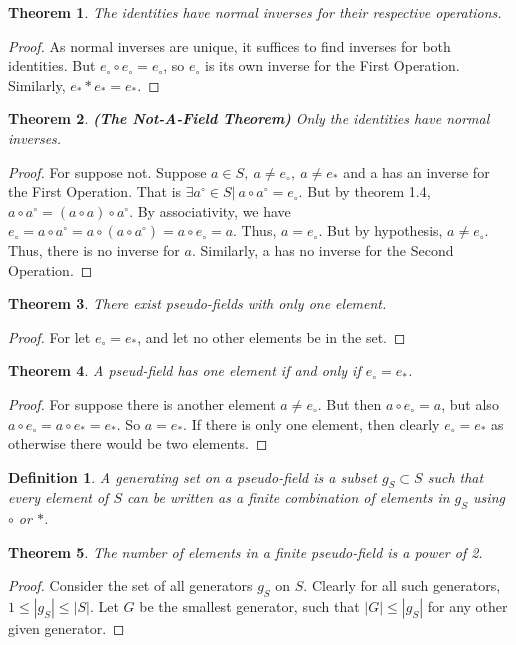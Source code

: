 \documentclass[12pt,oneside]{book}
\theoremstyle{mystyle}
\newtheorem{theorem}{Theorem}[section]
\newtheorem{definition}{Definition}[section]
\begin{document}
\begin{theorem} The identities have normal inverses for their respective operations.
\end{theorem}
\begin{proof} As normal inverses are unique, it suffices to find inverses for both identities. But $e_{\circ}\circ e_{\circ}=e_{\circ}$, so $e_{\circ}$ is its own inverse for the First Operation. Similarly, $e_{*}*e_{*}=e_{*}$.
\end{proof}
\begin{theorem} \textbf{(The Not-A-Field Theorem)} Only the identities have normal inverses.
\end{theorem}
\begin{proof} For suppose not. Suppose $a\in S,\ a\ne e_{\circ},\ a\ne e_{*}$ and a has an inverse for the First Operation. That is $\exists a^{\circ}\in S|\ a\circ a^{\circ}=e_{\circ}$. But by theorem 1.4, $a\circ a^{\circ}=(a\circ a)\circ a^{\circ}$. By associativity, we have $e_{\circ}=a\circ a^{\circ} = a\circ (a\circ a^{\circ})=a\circ e_{\circ}=a$. Thus, $a=e_{\circ}$. But by hypothesis, $a\ne e_{\circ}$. Thus, there is no inverse for $a$. Similarly, a has no inverse for the Second Operation.
\end{proof}
\begin{theorem}
There exist pseudo-fields with only one element.
\end{theorem}
\begin{proof}
For let $e_{\circ} = e_{*}$, and let no other elements be in the set. 
\end{proof}
\begin{theorem}
A pseud-field has one element if and only if $e_{\circ} = e_{*}$.
\end{theorem}
\begin{proof}
For suppose there is another element $a \ne e_{\circ}$. But then $a \circ e_{\circ} = a$, but also $a \circ e_{\circ} = a \circ e_{*} = e_{*}$. So $a = e_{*}$. If there is only one element, then clearly $e_{\circ} = e_{*}$ as otherwise there would be two elements.
\end{proof}
\begin{definition} A generating set on a pseudo-field is a subset $g_S \subset S$ such that every element of $S$ can be written as a finite combination of elements in $g_S$ using $\circ$ or $*$.
\end{definition}
\begin{theorem}
The number of elements in a finite pseudo-field is a power of 2.
\end{theorem}
\begin{proof}
Consider the set of all generators $g_S$ on $S$. Clearly for all such generators, $1\leq |g_S|\leq |S|$. Let $G$ be the smallest generator, such that $|G| \leq |g_S|$ for any other given generator. 
\end{proof}
%
\end{document}
